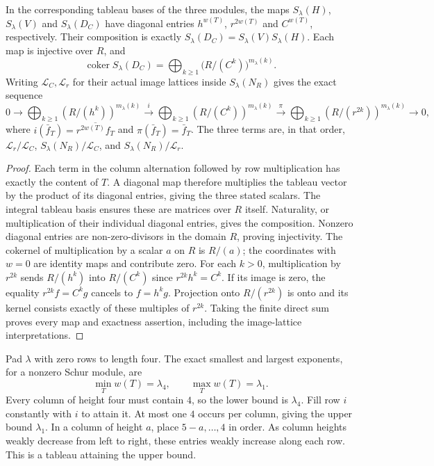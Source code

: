 \begin{theorem}\label{thm:plethysm-endpoint-diagonal}
In the corresponding tableau bases of the three modules, the maps
$S_\lambda(H)$, $S_\lambda(V)$ and $S_\lambda(D_C)$ have diagonal entries
$h^{w(T)}$, $r^{2w(T)}$ and $C^{w(T)}$, respectively. Their composition is exactly
$S_\lambda(D_C)=S_\lambda(V)S_\lambda(H)$. Each map is injective over
$R$, and
\[
 \operatorname{coker}S_\lambda(D_C)
 =\bigoplus_{k\ge1}\big(R/(C^k)\big)^{m_\lambda(k)}.
\]
Writing $\mathcal L_C,\mathcal L_r$ for their actual image lattices
inside $S_\lambda(N_R)$ gives the exact sequence
\begin{equation}\label{eq:plethysm-conductor-sequence}
 0\longrightarrow\bigoplus_{k\ge1}(R/(h^k))^{m_\lambda(k)}
 \xrightarrow{\ i\ }
 \bigoplus_{k\ge1}(R/(C^k))^{m_\lambda(k)}
 \xrightarrow{\ \pi\ }
 \bigoplus_{k\ge1}(R/(r^{2k}))^{m_\lambda(k)}
 \longrightarrow0,
\end{equation}
where $i(\bar f_T)=\overline{r^{2w(T)}f_T}$ and
$\pi(\bar f_T)=\bar f_T$. The three terms are, in that order,
$\mathcal L_r/\mathcal L_C$, $S_\lambda(N_R)/\mathcal L_C$,
and $S_\lambda(N_R)/\mathcal L_r$.
\end{theorem}

\begin{proof}
Each term in the column alternation followed by row multiplication
has exactly the content of $T$. A diagonal map therefore multiplies
the tableau vector by the product of its diagonal entries, giving
the three stated scalars. The integral tableau basis ensures these
are matrices over $R$ itself. Naturality, or multiplication of their
individual diagonal entries, gives the composition. Nonzero diagonal
entries are non-zero-divisors in the domain $R$, proving injectivity.
The cokernel of multiplication by a scalar $a$ on $R$ is $R/(a)$;
the coordinates with $w=0$ are identity maps and contribute zero.
For each $k>0$, multiplication by $r^{2k}$ sends $R/(h^k)$ into
$R/(C^k)$ since $r^{2k}h^k=C^k$. If its image is zero, the equality
$r^{2k}f=C^kg$ cancels to $f=h^kg$. Projection onto $R/(r^{2k})$
is onto and its kernel consists exactly of these multiples of
$r^{2k}$. Taking the finite direct sum proves every map and exactness
assertion, including the image-lattice interpretations.
\end{proof}

Pad $\lambda$ with zero rows to length four. The exact smallest and
largest exponents, for a nonzero Schur module, are
\begin{equation}\label{eq:plethysm-single-floors}
 \min_T w(T)=\lambda_4,\qquad \max_Tw(T)=\lambda_1.
\end{equation}
Every column of height four must contain $4$, so the lower bound is
$\lambda_4$. Fill row $i$ constantly with $i$ to attain it. At most
one $4$ occurs per column, giving the upper bound $\lambda_1$.
In a column of height $a$, place $5-a,\ldots,4$ in order. As column
heights weakly decrease from left to right, these entries weakly
increase along each row. This is a tableau attaining the upper bound.

